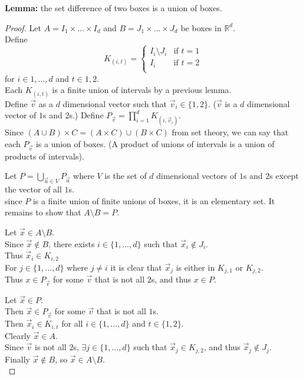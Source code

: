 \documentclass[12pt]{article}
\begin{document}
\textbf{Lemma:} the set difference of two boxes is a union of boxes.

\begin{proof}
	Let $A = I_{1} \times ... \times I_{d}$ and $B = J_{1} \times ... \times J_{d}$ be boxes in $\mathds{R}^{d}$. \\
	Define 
	\[ 
		K_{(i,t)} =
		\begin{cases} 
			I_{i} \setminus J_{i} & \text{if } t=1 \\
			I_{i} & \text{if } t=2 \\
		\end{cases}
	\]
	for $i \in {1,...,d}$ and $t \in {1,2}$.\\
	Each $K_{(i,t)}$ is a finite union of intervals by a previous lemma.\\
	Define $\vec{v}$ as a $d$ dimensional vector such that $\vec{v}_{i} \in \{1,2\}$. ($\vec{v}$ is a $d$ dimensional vector of $1$s and $2$s.)
	Define $P_{\vec{v}} = \prod\limits_{i=1}^{d} K_{(i,\vec{v}_{i})}$. \\
	Since $(A \cup B) \times C = (A \times C) \cup (B \times C)$ from set theory, we can say that each $P_{\vec{v}}$ is a union of boxes. (A product of unions of intervals is a union of products of intervals). \bigbreak
	
	Let $P = \bigcup\limits_{\vec{u} \in V} P_{\vec{u}}$ where $V$ is the set of $d$ dimensional vectors of $1$s and $2$s except the vector of all $1$s. \\
	since $P$ is a finite union of finite unions of boxes, it is an elementary set. It remains to show that $A \setminus B = P$. \bigbreak
	
	Let $\vec{x} \in A \setminus B$. \\
	Since $\vec{x} \notin B$, there exists $i \in \{1,...,d\}$ such that $\vec{x}_{i} \notin J_{i}$. \\
	Thus $\vec{x}_{i} \in K_{i,2}$ \\
	For $j \in \{1,...,d\}$ where $j \neq i$ it is clear that $\vec{x}_{j}$ is either in $ K_{j,1}$ or $ K_{j,2}$. \\
	Thus $x \in P_{\vec{v}}$ for some $\vec{v}$ that is not all $2$s, and thus $x \in P$. \bigbreak 
	
	Let $\vec{x} \in P$. \\
	Then $\vec{x} \in P_{\vec{v}}$ for some $\vec{v}$ that is not all $1$s. \\
	Then $\vec{x}_{i} \in K_{i,t}$ for all $i \in \{1,...,d\}$ and $t \in \{1,2\}$. \\
	Clearly $\vec{x} \in A$. \\
	Since $\vec{v}$ is not all $2$s, $\exists j \in \{1,...,d\}$ such that $\vec{x}_{j} \in K_{j,2}$, and thus $\vec{x}_{j} \notin J_{j}$. \\
	Finally $\vec{x} \notin B$, so $\vec{x} \in A \setminus B$.	\\
\end{proof}
\end{document}
